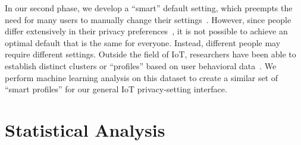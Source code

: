 In our second phase, we develop a ``smart'' default setting, which preempts the need for many users to manually change their settings~\cite{smith2013choice}. However, since people differ extensively in their privacy preferences~\cite{olson2005study}, it is not possible to achieve an optimal default that is the same for everyone. Instead, different people may require different settings. Outside the field of IoT, researchers have been able to establish distinct clusters or ``profiles'' based on user behavioral data~\cite{knijnenburg2013dimensionality, olson2005study, wisniewski2017making}. We perform machine learning analysis on this dataset to create a similar set of ``smart profiles'' for our general IoT privacy-setting interface.

\section{Statistical Analysis}

